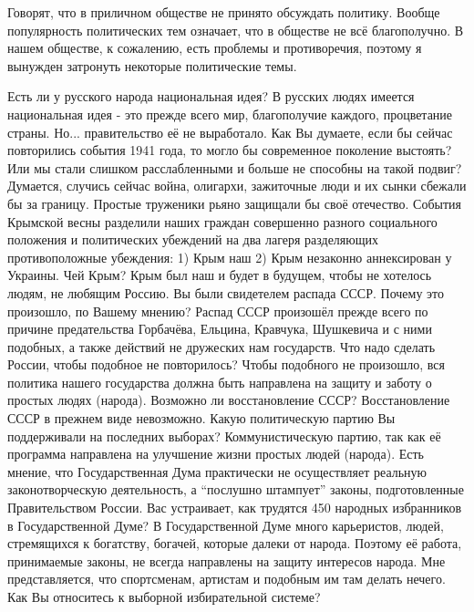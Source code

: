 \begin{drama}
	\maxspeaks Говорят, что в приличном обществе не принято обсуждать политику. Вообще популярность политических тем означает, что в обществе не всё благополучно. В нашем обществе, к сожалению, есть проблемы и противоречия, поэтому я вынужден затронуть некоторые политические темы.
	
	Есть ли у русского народа национальная идея?
	\michaelspeaks В русских людях имеется национальная идея - это прежде всего мир, благополучие каждого, процветание страны. Но... правительство её не выработало.
	\maxspeaks Как Вы думаете, если бы сейчас повторились события 1941 года, то могло бы современное поколение выстоять? Или мы стали слишком расслабленными и больше не способны на такой подвиг?
	\michaelspeaks Думается, случись сейчас война, олигархи, зажиточные люди и их сынки сбежали бы за границу. Простые труженики рьяно защищали бы своё отечество.
	\maxspeaks События Крымской весны разделили наших граждан совершенно разного социального положения и политических убеждений на два лагеря разделяющих противоположные убеждения: 1) Крым наш 2) Крым незаконно аннексирован у Украины. Чей Крым?
	\michaelspeaks Крым был наш и будет в будущем, чтобы не хотелось людям, не любящим Россию.
	\maxspeaks Вы были свидетелем распада СССР. Почему это произошло, по Вашему мнению? 
	\michaelspeaks Распад СССР произошёл прежде всего по причине предательства Горбачёва, Ельцина, Кравчука, Шушкевича и с ними подобных, а также действий не дружеских нам государств.	
	\maxspeaks Что надо сделать России, чтобы подобное не повторилось? 
	\michaelspeaks Чтобы подобного не произошло, вся политика нашего государства должна быть направлена на защиту и заботу о простых людях (народа).
	\maxspeaks Возможно ли восстановление СССР?
	\michaelspeaks Восстановление СССР в прежнем виде невозможно. 
	\maxspeaks Какую политическую партию Вы поддерживали на последних выборах? 
	\michaelspeaks Коммунистическую партию, так как её программа направлена на улучшение жизни простых людей (народа).
	\maxspeaks Есть мнение, что Государственная Дума практически не осуществляет реальную законотворческую деятельность, а “послушно штампует” законы, подготовленные Правительством России. Вас устраивает, как трудятся 450 народных избранников в Государственной Думе? 
	\michaelspeaks В Государственной Думе много карьеристов, людей, стремящихся к богатству, богачей, которые далеки от народа. Поэтому её работа, принимаемые законы, не всегда направлены на защиту интересов народа. Мне представляется, что спортсменам, артистам и подобным им там делать нечего.
	\maxspeaks Как Вы относитесь к выборной избирательной системе? 

\end{drama}
